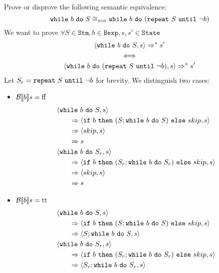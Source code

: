 \begin{exercise}{
    Prove or disprove the following semantic equivalence:
    \[ \texttt{while}\ b\ \texttt{do}\ S \cong_{\text{\tiny SOS}} \texttt{while}\ b\ \texttt{do}\ (\texttt{repeat}\ S\ \texttt{until}\ \neg b)  \]\vspace*{-0.6cm}
}
    We want to prove $\forall S \in \texttt{Stm}, b \in \texttt{Bexp}, s, s' \in \texttt{State}$
    \begin{gather*}
        \left<\texttt{while}\ b\ \texttt{do}\ S, s\right> \Rightarrow^* s' \\
        \iff \\
        \left<\texttt{while}\ b\ \texttt{do}\ (\texttt{repeat}\ S\ \texttt{until}\ \neg b), s\right> \Rightarrow^* s'
    \end{gather*}
    Let $S_r = \texttt{repeat}\ S\ \texttt{until}\ \neg b$ for brevity.
    We distinguish two cases:
    \begin{itemize}
        \item $\mathcal{B} \llbracket b \rrbracket s = \text{ff}$
            \begin{align*}
                &\left<\texttt{while}\ b\ \texttt{do}\ S, s\right>
                \\&\qquad\Rightarrow \left<\texttt{if}\ b\ \texttt{then}\ (S;\texttt{while}\ b\ \texttt{do}\ S)\ \texttt{else}\ skip, s\right>
                \\&\qquad\Rightarrow \left<skip, s\right>
                \\&\qquad\Rightarrow s
                \\
                &\left<\texttt{while}\ b\ \texttt{do}\ S_r, s\right>
                \\&\qquad\Rightarrow \left<\texttt{if}\ b\ \texttt{then}\ (S_r; \texttt{while}\ b\ \texttt{do}\ S_r)\ \texttt{else}\ skip, s\right>
                \\&\qquad\Rightarrow \left<skip, s\right>
                \\&\qquad\Rightarrow s
            \end{align*}
        \item $\mathcal{B} \llbracket b \rrbracket s = \text{tt}$
            \begin{align*}
                &\left<\texttt{while}\ b\ \texttt{do}\ S, s\right>
                \\&\qquad\Rightarrow \left<\texttt{if}\ b\ \texttt{then}\ (S;\texttt{while}\ b\ \texttt{do}\ S)\ \texttt{else}\ skip, s\right>
                \\&\qquad\Rightarrow \left<S;\texttt{while}\ b\ \texttt{do}\ S, s\right>
                \\
                &\left<\texttt{while}\ b\ \texttt{do}\ S_r, s\right>
                \\&\qquad\Rightarrow \left<\texttt{if}\ b\ \texttt{then}\ (S_r; \texttt{while}\ b\ \texttt{do}\ S_r)\ \texttt{else}\ skip, s\right>
                \\&\qquad\Rightarrow \left<S_r; \texttt{while}\ b\ \texttt{do}\ S_r, s\right>
            \end{align*}
            \begin{itemize}

\end{itemize}
\end{itemize}
\end{exercise}
